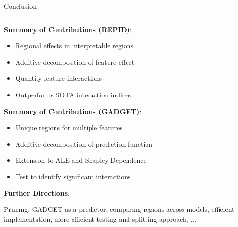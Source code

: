     
    \begin{frame}{Conclusion}
    
    \begin{columns}[T, totalwidth = \textwidth]
        \begin{column}{0.53\textwidth}
    
     \textbf{Summary of Contributions (REPID)}:
     \begin{itemize}
        \item Regional effects in interpretable regions
        \item Additive decomposition of feature effect 
        \item Quantify feature interactions 
        \item Outperforms SOTA interaction indices
    \end{itemize}
    
     \textbf{Summary of Contributions (GADGET)}:
     \begin{itemize}
     \item Unique regions for multiple features
     \item Additive decomposition of prediction function%
     \item Extension to ALE and Shapley Dependence
     \item Test to identify significant interactions
    \end{itemize}
    
    \textbf{Further Directions}: 
    
    Pruning, GADGET as a predictor, comparing regions across models, efficient implementation, more efficient testing and splitting approach, $\dots$
     

\end{column}
\end{columns}
\end{frame}
